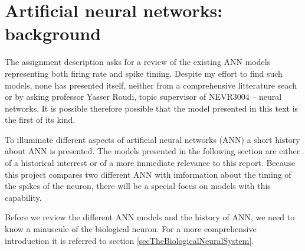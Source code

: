 % 			
% 			
% 			
% 			
% 			
%
%
%
%
%
%
%
\chapter{Artificial neural networks: background}

The assignment description asks for a review of the existing ANN models representing both firing rate and spike timing.
Despite my effort to find such models, none has presented itself, neither from a comprehensive litterature seach or by asking professor Yasser Roudi, topic supervisor of NEVR3004 -- neural networks.
It is possible therefore possible that the model presented in this text is the first of its kind.

To illuminate different aspects of artificial neural networks (ANN) a short history about ANN is presented. 
The models presented in the following section are either of a historical interrest or of a more immediate relevance to this report.
Because this project compares two different ANN with imformation about the timing of the spikes of the neuron, there will be a special focus on models with this capability. %
%



Before we review the different ANN models and the history of ANN, we need to know a minuscule of the biological neuron. For a more comprehensive introduction it is referred to section \ref{secTheBiologicalNeuralSystem}.

